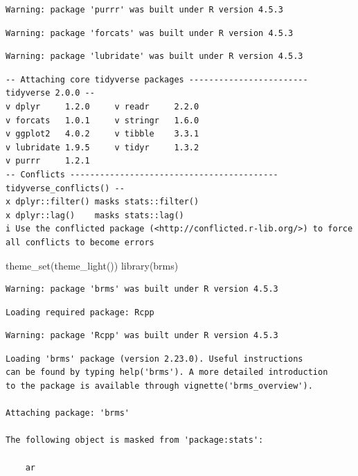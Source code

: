 \documentclass[
  letterpaper,
  DIV=11,
  numbers=noendperiod]{scrartcl}
\newenvironment{Shaded}{\begin{snugshade}}{\end{snugshade}}
\newcommand{\FunctionTok}[1]{\textcolor[rgb]{0.28,0.35,0.67}{#1}}
\newcommand{\NormalTok}[1]{\textcolor[rgb]{0.00,0.23,0.31}{#1}}
\begin{document}
\begin{verbatim}
Warning: package 'purrr' was built under R version 4.5.3
\end{verbatim}

\begin{verbatim}
Warning: package 'forcats' was built under R version 4.5.3
\end{verbatim}

\begin{verbatim}
Warning: package 'lubridate' was built under R version 4.5.3
\end{verbatim}

\begin{verbatim}
-- Attaching core tidyverse packages ------------------------ tidyverse 2.0.0 --
v dplyr     1.2.0     v readr     2.2.0
v forcats   1.0.1     v stringr   1.6.0
v ggplot2   4.0.2     v tibble    3.3.1
v lubridate 1.9.5     v tidyr     1.3.2
v purrr     1.2.1     
-- Conflicts ------------------------------------------ tidyverse_conflicts() --
x dplyr::filter() masks stats::filter()
x dplyr::lag()    masks stats::lag()
i Use the conflicted package (<http://conflicted.r-lib.org/>) to force all conflicts to become errors
\end{verbatim}

\begin{Shaded}
\begin{Highlighting}[]
\FunctionTok{theme\_set}\NormalTok{(}\FunctionTok{theme\_light}\NormalTok{())}
\FunctionTok{library}\NormalTok{(brms)}
\end{Highlighting}
\end{Shaded}

\begin{verbatim}
Warning: package 'brms' was built under R version 4.5.3
\end{verbatim}

\begin{verbatim}
Loading required package: Rcpp
\end{verbatim}

\begin{verbatim}
Warning: package 'Rcpp' was built under R version 4.5.3
\end{verbatim}

\begin{verbatim}
Loading 'brms' package (version 2.23.0). Useful instructions
can be found by typing help('brms'). A more detailed introduction
to the package is available through vignette('brms_overview').

Attaching package: 'brms'

The following object is masked from 'package:stats':

    ar
\end{verbatim}
\end{document}

